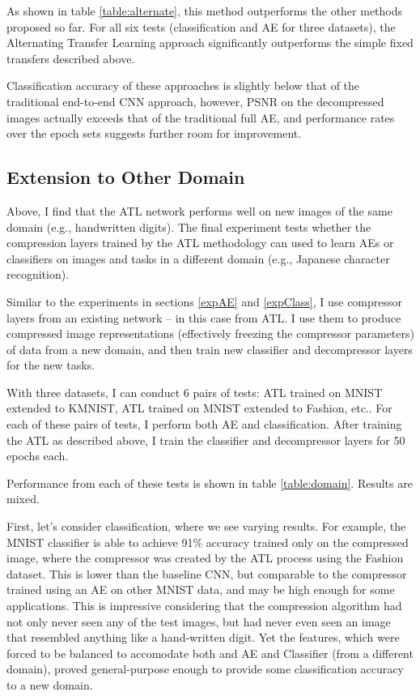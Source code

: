 \documentclass[twoside,11pt]{article}
\begin{document}
As shown in table \ref{table:alternate}, this method outperforms the other methods proposed so far.
For all six tests (classification and AE for three datasets), the Alternating Transfer Learning 
approach significantly outperforms the simple fixed transfers described above. 

Classification accuracy of these approaches is slightly below that of the traditional 
end-to-end CNN approach, however, PSNR on the decompressed images actually exceeds that
of the traditional full AE, and performance rates over the epoch sets suggests further room
for improvement. 

\subsection{Extension to Other Domain}

Above, I find that the ATL network performs well on new images of the same domain (e.g., 
handwritten digits). The final experiment tests whether the compression layers trained
by the ATL methodology can used to learn AEs or classifiers on images and tasks in a 
different domain (e.g., Japanese character recognition).

Similar to the experiments in sections \ref{expAE} and \ref{expClass}, I use compressor
layers from an existing network -- in this case from ATL. I use them to produce compressed
image representations (effectively freezing the compressor parameters) of data
from a new domain, and then train 
new classifier and decompressor layers for the new tasks. 

With three datasets, I can conduct 6 pairs of tests: ATL trained on MNIST extended to
KMNIST, ATL trained on MNIST extended to Fashion, etc.. For each of these pairs of tests, 
I perform both AE and classification. After training the ATL as described above, 
I train the classifier and decompressor layers for 50 epochs each.


Performance from each of these tests is shown in table \ref{table:domain}. Results are mixed.

First, let's consider classification, where we see varying results. For example, the MNIST 
classifier is able to achieve 91\% accuracy trained only on the compressed image, where
the compressor was created by the ATL process using the Fashion dataset. This is lower than 
the baseline CNN, but comparable to the compressor trained using an AE on other MNIST data,
and may be high enough for some applications. This is impressive considering that the compression
algorithm had not only never seen any of the test images, but had never even seen an image
that resembled anything like a hand-written digit. Yet the features, which were forced to be 
balanced to accomodate both and AE and Classifier (from a different domain), proved 
general-purpose enough to provide some classification accuracy to a new domain.
\end{document}
